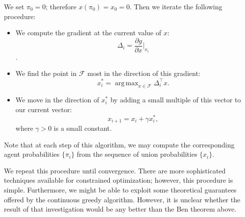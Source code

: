 \documentclass{article}
\newcommand{\cm}[1]{\mathcal{#1}}
\newcommand{\trans}{^{\top}}
\DeclareMathOperator*{\argmax}{arg\,max}
\begin{document}
We set $\pi_0 = 0$; therefore $x(\pi_0) = x_0 = 0$.  Then we iterate
the following procedure:
\begin{itemize}
\item
  We compute the gradient at the current value of $x$:
  \[\Delta_i = \frac{\partial g}{\partial x}\Biggr\rvert_{x_i}\].
\item
  We find the point in $\cm{F}$ most in the direction of this gradient:
  \[
    x^\ast_i = \argmax_{x \in \cm{F}} \Delta_i\trans x.
  \]
\item
  We move in the direction of $x^\ast_i$ by adding a small multiple of
  this vector to our current vector:
  \[
    x_{i + 1} = x_i + \gamma x^\ast_i,
  \]
  where $\gamma > 0$ is a small constant.
\end{itemize}
Note that at each step of this algorithm, we may compute the
corresponding agent probabilities $\{\pi_i\}$ from the sequence of union
probabilities $\{x_i\}$.

We repeat this procedure until convergence.  There are more
sophisticated techniques available for constrained optimization;
however, this procedure is simple.  Furthermore, we might be able to
exploit some theoretical guarantees offered by the continuous greedy
algorithm.  However, it is unclear whether the result of that
investigation would be any better than the Ben theorem above.
\end{document}
